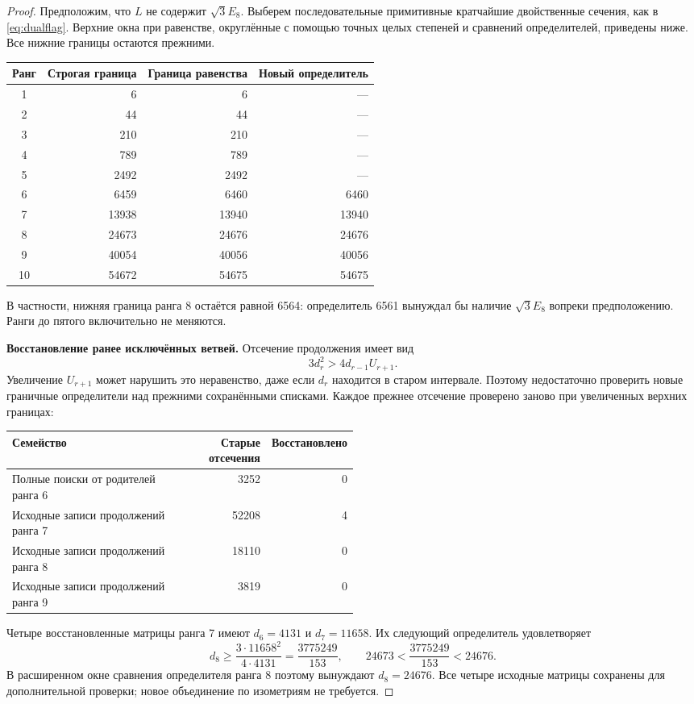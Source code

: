 \begin{proof}
Предположим, что $L$ не содержит $\sqrt3E_8$. Выберем последовательные примитивные кратчайшие двойственные сечения, как в \eqref{eq:dualflag}. Верхние окна при равенстве, округлённые с помощью точных целых степеней и сравнений определителей, приведены ниже. Все нижние границы остаются прежними.
\begin{center}
\begin{tabular}{crrr}
\toprule
Ранг & Строгая граница & Граница равенства & Новый определитель\\\midrule
1&6&6&---\\
2&44&44&---\\
3&210&210&---\\
4&789&789&---\\
5&2492&2492&---\\
6&6459&6460&6460\\
7&13938&13940&13940\\
8&24673&24676&24676\\
9&40054&40056&40056\\
10&54672&54675&54675\\
\bottomrule
\end{tabular}
\end{center}
В частности, нижняя граница ранга 8 остаётся равной 6564: определитель 6561 вынуждал бы наличие $\sqrt3E_8$ вопреки предположению. Ранги до пятого включительно не меняются.

\textbf{Восстановление ранее исключённых ветвей.}
Отсечение продолжения имеет вид
\[
3d_r^2>4d_{r-1}U_{r+1}.
\]
Увеличение $U_{r+1}$ может нарушить это неравенство, даже если $d_r$ находится в старом интервале. Поэтому недостаточно проверить новые граничные определители над прежними сохранёнными списками. Каждое прежнее отсечение проверено заново при увеличенных верхних границах:
\begin{center}
\begin{tabular}{P{0.50\linewidth}rr}
\toprule
Семейство & Старые отсечения & Восстановлено\\\midrule
Полные поиски от родителей ранга 6 &3252&0\\
Исходные записи продолжений ранга 7 &52208&4\\
Исходные записи продолжений ранга 8 &18110&0\\
Исходные записи продолжений ранга 9 &3819&0\\
\bottomrule
\end{tabular}
\end{center}
Четыре восстановленные матрицы ранга 7 имеют $d_6=4131$ и $d_7=11658$. Их следующий определитель удовлетворяет
\begin{equation}\label{eq:restored7floor}
d_8\ge\frac{3\cdot11658^2}{4\cdot4131}
=\frac{3775249}{153},\qquad
24673<\frac{3775249}{153}<24676.
\end{equation}
В расширенном окне сравнения определителя ранга 8 поэтому вынуждают $d_8=24676$. Все четыре исходные матрицы сохранены для дополнительной проверки; новое объединение по изометриям не требуется.


\end{proof}
